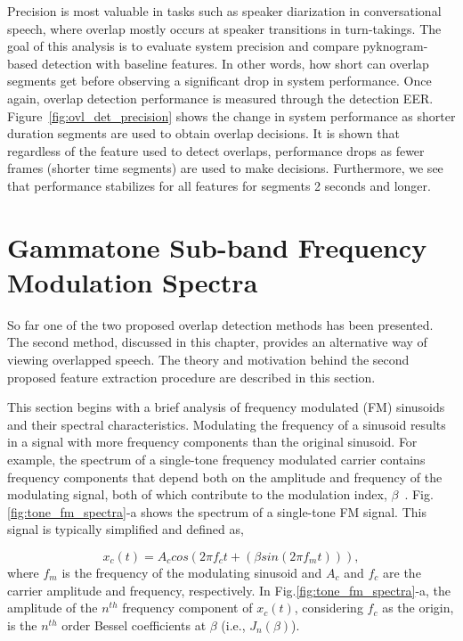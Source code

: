 {Precision is most valuable in tasks such as speaker diarization in conversational speech, where overlap mostly occurs at speaker transitions in turn-takings. 
The goal of this analysis is to evaluate system precision and compare pyknogram-based detection with baseline features. 
In other words, how short can overlap segments get before observing a significant drop in system performance. 
Once again, overlap detection performance is measured through the detection EER. 
Figure~\ref{fig:ovl_det_precision} shows the change in system performance as shorter duration segments are used to obtain overlap decisions. 
It is shown that regardless of the feature used to detect overlaps, performance drops as fewer frames (shorter time segments) are used to make decisions. 
Furthermore, we see that performance stabilizes for all features for segments 2 seconds and longer. 


\newpage
\section{Gammatone Sub-band Frequency Modulation Spectra}
\label{sec:ch2_GSFM}
So far one of the two proposed overlap detection methods has been presented. 
The second method, discussed in this chapter, provides an alternative way of viewing overlapped speech. 
The theory and motivation behind the second proposed feature extraction procedure are described in this section. 

This section begins with a brief analysis of frequency modulated (FM) sinusoids and their spectral characteristics. 
Modulating the frequency of a sinusoid results in a signal with more frequency components than the original sinusoid. 
For example, the spectrum of a single-tone frequency modulated carrier contains frequency components that depend both on the amplitude and frequency of the modulating signal, both of which contribute to the modulation index, $\beta$~\cite{carlson2010communication}. 
Fig.\ref{fig:tone_fm_spectra}-a shows the spectrum of a single-tone FM signal. 
This signal is typically simplified and defined as, 

\begin{equation}
\label{eq:1sin_fm}
x_c(t) = A_ccos(2\pi f_ct+(\beta sin(2\pi f_mt))),
\end{equation}
where $f_m$ is the frequency of the modulating sinusoid and $A_c$ and $f_c$ are the carrier amplitude and frequency, respectively. 
In Fig.\ref{fig:tone_fm_spectra}-a, the amplitude of the $n^{th}$ frequency component of $x_c(t)$, considering $f_c$ as the origin, is the $n^{th}$ order Bessel coefficients at $\beta$ (i.e., $J_n(\beta)$). 

}
